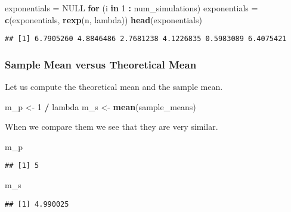 \documentclass[]{article}
\newenvironment{Shaded}{\begin{snugshade}}{\end{snugshade}}
\newcommand{\KeywordTok}[1]{\textcolor[rgb]{0.13,0.29,0.53}{\textbf{#1}}}
\newcommand{\DecValTok}[1]{\textcolor[rgb]{0.00,0.00,0.81}{#1}}
\newcommand{\StringTok}[1]{\textcolor[rgb]{0.31,0.60,0.02}{#1}}
\newcommand{\OtherTok}[1]{\textcolor[rgb]{0.56,0.35,0.01}{#1}}
\newcommand{\ControlFlowTok}[1]{\textcolor[rgb]{0.13,0.29,0.53}{\textbf{#1}}}
\newcommand{\OperatorTok}[1]{\textcolor[rgb]{0.81,0.36,0.00}{\textbf{#1}}}
\newcommand{\NormalTok}[1]{#1}
\begin{document}
\begin{Shaded}
\begin{Highlighting}[]
\NormalTok{exponentials =}\StringTok{ }\OtherTok{NULL}
\ControlFlowTok{for}\NormalTok{ (i }\ControlFlowTok{in} \DecValTok{1} \OperatorTok{:}\StringTok{ }\NormalTok{num_simulations) exponentials =}\StringTok{ }\KeywordTok{c}\NormalTok{(exponentials, }\KeywordTok{rexp}\NormalTok{(n, lambda))}
\KeywordTok{head}\NormalTok{(exponentials)}
\end{Highlighting}
\end{Shaded}

\begin{verbatim}
## [1] 6.7905260 4.8846486 2.7681238 4.1226835 0.5983089 6.4075421
\end{verbatim}

\subsubsection{Sample Mean versus Theoretical
Mean}\label{sample-mean-versus-theoretical-mean}

Let us compute the theoretical mean and the sample mean.

\begin{Shaded}
\begin{Highlighting}[]
\NormalTok{m_p <-}\StringTok{ }\DecValTok{1} \OperatorTok{/}\StringTok{ }\NormalTok{lambda}
\NormalTok{m_s <-}\StringTok{ }\KeywordTok{mean}\NormalTok{(sample_means)}
\end{Highlighting}
\end{Shaded}

When we compare them we see that they are very similar.

\begin{Shaded}
\begin{Highlighting}[]
\NormalTok{m_p}
\end{Highlighting}
\end{Shaded}

\begin{verbatim}
## [1] 5
\end{verbatim}

\begin{Shaded}
\begin{Highlighting}[]
\NormalTok{m_s}
\end{Highlighting}
\end{Shaded}

\begin{verbatim}
## [1] 4.990025
\end{verbatim}
\end{document}
